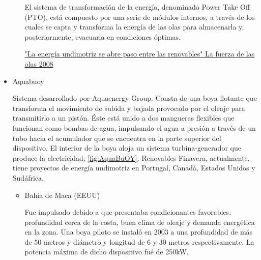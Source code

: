 \begin{itemize}
\begin{itemize}
    El sistema de transformación de la energía, denominado Power Take
    Off (PTO), está compuesto por una serie de módulos internos, a
    través de los cuales se capta y transforma la energía de las olas
    para almacenarla y, posteriormente, evacuarla en condiciones
    óptimas.

    \href{https://www.scribd.com/document/328163965/La-Fuerza-de-Las-Olas}{"La
    energía undimotriz se abre paso entre las renovables" La fuerza de
    las olas 2008}\\
  \end{itemize}
\item
  Aquabuoy

  Sistema desarrollado por Aquaenergy Group. Consta de una boya flotante
  que transforma el movimiento de subida y bajada provocado por el
  oleaje para transmitirlo a un pistón. Éste está unido a dos mangueras
  flexibles que funcionan como bombas de agua, impulsando el agua a
  presión a través de un tubo hacia el acumulador que se encuentra en la
  parte superior del dispositivo. El interior de la boya aloja un
  sistema turbina-generador que produce la electricidad, \autoref{fig:AquaBuOY}. Renovables
  Finavera, actualmente, tiene proyectos de energía undimotriz en
  Portugal, Canadá, Estados Unidos y Sudáfrica.



  \begin{itemize}
  \item
    Bahia de Maca (EEUU)

    Fue impulsado debido a que presentaba condicionantes favorables:
    profundidad cerca de la costa, buen clima de oleaje y demanda
    energética en la zona. Una boya piloto se instaló en 2003 a una
    profundidad de más de 50 metros y diámetro y longitud de 6 y 30
    metros respectivamente. La potencia máxima de dicho dispositivo fué
    de 250kW.
  \end{itemize}
\end{itemize}

